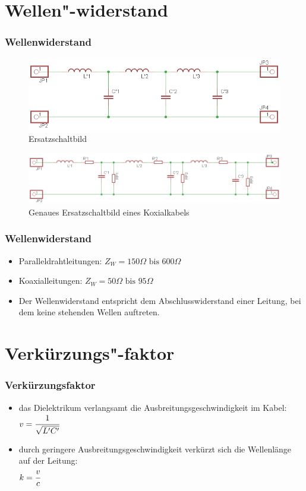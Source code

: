 \section{Wellen"-widerstand}
\begin{frame}
  \frametitle{Wellenwiderstand}
  \begin{figure}
    \includegraphics[width=\textwidth,height=.30\textheight,keepaspectratio]{a10/wellenesb.png}
    \caption{Ersatzschaltbild}
  \end{figure}
  \begin{figure}
    \includegraphics[width=\textwidth,height=.30\textheight,keepaspectratio]{a10/wellenesbex.png}
    \caption{Genaues Ersatzschaltbild eines Koxialkabels}
  \end{figure}
\end{frame}

\begin{frame}
  \frametitle{Wellenwiderstand}
  \begin{itemize}
      \begin{block}{Wellenwiderstand}
        $Z_W = \sqrt{\cfrac{L'}{C'}}$
      \end{block}
    \item Paralleldrahtleitungen: $Z_W = 150 \Omega \text{ bis } 600 \Omega$
    \item Koaxialleitungen: $Z_W = 50 \Omega \text{ bis } 95 \Omega$
    \item Der Wellenwiderstand entspricht dem Abschlusswiderstand einer Leitung, bei dem keine stehenden Wellen auftreten.
  \end{itemize}
\end{frame}

\section{Verkürzungs"-faktor}
\begin{frame}
  \frametitle{Verkürzungsfaktor}
  \begin{itemize}
    \item das Dielektrikum verlangsamt die Ausbreitungsgeschwindigkeit im Kabel: \\
      $v = \cfrac{1}{\sqrt{L' C'}}$
    \item durch geringere Ausbreitungsgeschwindigkeit verkürzt sich die
      Wellenlänge auf der Leitung: \\ $k = \cfrac{v}{c}$
  \end{itemize}
\end{frame}


